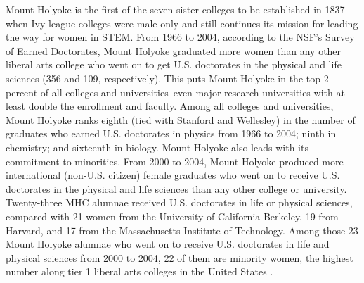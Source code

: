\documentclass[utf8]{frontiersSCNS} %
\begin{document}
Mount Holyoke is the first of the seven sister colleges to be established in 1837 when Ivy league colleges were male only and still continues its mission for leading the way for women in STEM. From 1966 to 2004, according to the NSF’s Survey of Earned Doctorates, Mount Holyoke graduated more women than any other liberal arts college who went on to get U.S. doctorates in the physical and life sciences (356 and 109, respectively). This puts Mount Holyoke in the top 2 percent of all colleges and universities--even major research universities with at least double the enrollment and faculty. Among all colleges and universities, Mount Holyoke ranks eighth (tied with Stanford and Wellesley) in the number of graduates who earned U.S. doctorates in physics from 1966 to 2004; ninth in chemistry; and sixteenth in biology.  Mount Holyoke also leads with its commitment to minorities. From 2000 to 2004, Mount Holyoke produced more international (non-U.S. citizen) female graduates who went on to receive U.S. doctorates in the physical and life sciences than any other college or university. Twenty-three MHC alumnae received U.S. doctorates in life or physical sciences, compared with 21 women from the University of California-Berkeley, 19 from Harvard, and 17 from the Massachusetts Institute of Technology. Among those 23  Mount Holyoke alumnae who went on to receive U.S. doctorates in life and physical sciences from 2000 to 2004, 22 of them are minority women, the highest number along tier 1 liberal arts colleges in the United States \citep{MHC}. 

\end{document}
